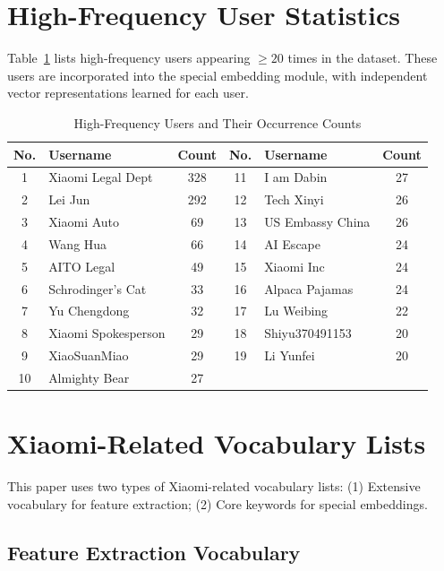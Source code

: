 \documentclass[10pt]{article}
\begin{document}
\newpage
\appendix

\section{High-Frequency User Statistics}
\label{appendix:vip_users}

Table~\ref{tab:vip_users} lists high-frequency users appearing $\geq 20$ times in the dataset. These users are incorporated into the special embedding module, with independent vector representations learned for each user.

\begin{table}[H]
\centering
\caption{High-Frequency Users and Their Occurrence Counts}
\label{tab:vip_users}
\begin{tabular}{clc|clc}
\toprule
\textbf{No.} & \textbf{Username} & \textbf{Count} & \textbf{No.} & \textbf{Username} & \textbf{Count} \\
\midrule
1 & Xiaomi Legal Dept & 328 & 11 & I am Dabin & 27 \\
2 & Lei Jun & 292 & 12 & Tech Xinyi & 26 \\
3 & Xiaomi Auto & 69 & 13 & US Embassy China & 26 \\
4 & Wang Hua & 66 & 14 & AI Escape & 24 \\
5 & AITO Legal & 49 & 15 & Xiaomi Inc & 24 \\
6 & Schrodinger's Cat & 33 & 16 & Alpaca Pajamas & 24 \\
7 & Yu Chengdong & 32 & 17 & Lu Weibing & 22 \\
8 & Xiaomi Spokesperson & 29 & 18 & Shiyu370491153 & 20 \\
9 & XiaoSuanMiao & 29 & 19 & Li Yunfei & 20 \\
10 & Almighty Bear & 27 & & & \\
\bottomrule
\end{tabular}
\end{table}

\section{Xiaomi-Related Vocabulary Lists}
\label{appendix:xiaomi_keywords}

This paper uses two types of Xiaomi-related vocabulary lists: (1) Extensive vocabulary for feature extraction; (2) Core keywords for special embeddings.

\subsection{Feature Extraction Vocabulary}
\end{document}
